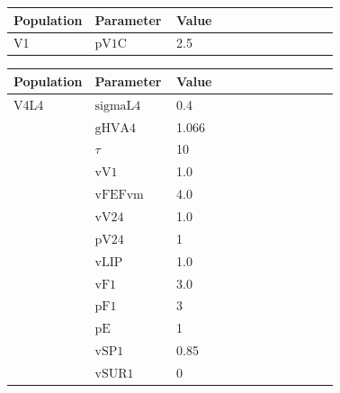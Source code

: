 \documentclass{article}
\begin{document}
\vspace{2ex}

\noindent
\begin{tabularx}{\linewidth}{|p{0.25\linewidth}|p{0.25\linewidth}|X|}\hline
\textbf{Population} & \textbf{Parameter} & \textbf{Value}   \\ \hline

    V1             & ${\text{pV1C}}$        & 2.5  \\ \hline

\end{tabularx}

\vspace{2ex}

\noindent
\begin{tabularx}{\linewidth}{|p{0.25\linewidth}|p{0.25\linewidth}|X|}\hline
\textbf{Population} & \textbf{Parameter} & \textbf{Value}   \\ \hline

    V4L4             & ${\text{sigmaL4}}$        & 0.4  \\ \hline

                 & ${\text{gHVA4}}$        & 1.066  \\ \hline

                 & $\tau$        & 10  \\ \hline

                 & ${\text{vV1}}$        & 1.0  \\ \hline

                 & ${\text{vFEFvm}}$        & 4.0  \\ \hline

                 & ${\text{vV24}}$        & 1.0  \\ \hline

                 & ${\text{pV24}}$        & 1  \\ \hline

                 & ${\text{vLIP}}$        & 1.0  \\ \hline

                 & ${\text{vF1}}$        & 3.0  \\ \hline

                 & ${\text{pF1}}$        & 3  \\ \hline

                 & ${\text{pE}}$        & 1  \\ \hline

                 & ${\text{vSP1}}$        & 0.85  \\ \hline

                 & ${\text{vSUR1}}$        & 0  \\ \hline

\end{tabularx}
\end{document}
